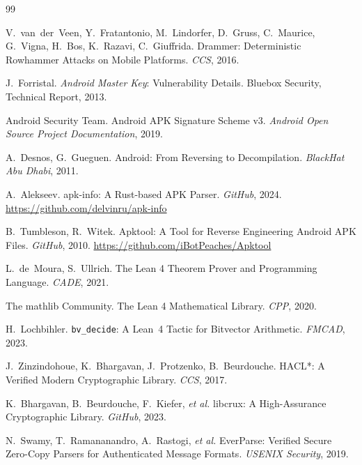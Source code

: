 \documentclass[runningheads]{llncs}
\begin{document}

\begin{thebibliography}{99}

V.~van~der~Veen, Y.~Fratantonio, M.~Lindorfer, D.~Gruss, C.~Maurice,
G.~Vigna, H.~Bos, K.~Razavi, C.~Giuffrida.
\newblock Drammer: Deterministic Rowhammer Attacks on Mobile Platforms.
\newblock \emph{CCS}, 2016.

J.~Forristal.
\newblock \emph{Android Master Key}: Vulnerability Details.
\newblock Bluebox Security, Technical Report, 2013.

Android Security Team.
\newblock Android APK Signature Scheme v3.
\newblock \emph{Android Open Source Project Documentation}, 2019.

A.~Desnos, G.~Gueguen.
\newblock Android: From Reversing to Decompilation.
\newblock \emph{BlackHat Abu Dhabi}, 2011.

A.~Alekseev.
\newblock apk-info: A Rust-based APK Parser.
\newblock \emph{GitHub}, 2024. \url{https://github.com/delvinru/apk-info}

B.~Tumbleson, R.~Witek.
\newblock Apktool: A Tool for Reverse Engineering Android APK Files.
\newblock \emph{GitHub}, 2010. \url{https://github.com/iBotPeaches/Apktool}

L.~de~Moura, S.~Ullrich.
\newblock The Lean 4 Theorem Prover and Programming Language.
\newblock \emph{CADE}, 2021.

The mathlib Community.
\newblock The Lean 4 Mathematical Library.
\newblock \emph{CPP}, 2020.

H.~Lochbihler.
\newblock \texttt{bv\_decide}: A Lean~4 Tactic for Bitvector Arithmetic.
\newblock \emph{FMCAD}, 2023.

J.~Zinzindohoue, K.~Bhargavan, J.~Protzenko, B.~Beurdouche.
\newblock HACL*: A Verified Modern Cryptographic Library.
\newblock \emph{CCS}, 2017.

K.~Bhargavan, B.~Beurdouche, F.~Kiefer, \emph{et al.}
\newblock libcrux: A High-Assurance Cryptographic Library.
\newblock \emph{GitHub}, 2023.

N.~Swamy, T.~Ramananandro, A.~Rastogi, \emph{et al.}
\newblock EverParse: Verified Secure Zero-Copy Parsers for Authenticated
  Message Formats.
\newblock \emph{USENIX Security}, 2019.


\end{thebibliography}
\end{document}
